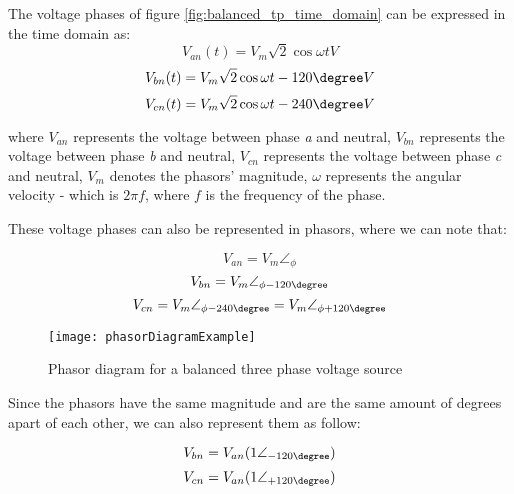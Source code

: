 The voltage phases of figure \ref{fig:balanced_tp_time_domain} can be expressed in the time domain as:
\begin{equation} \label{eq:balanced_tpVan_timedomain}
	V_{an}(t) = V_{m}\sqrt{2}\cos{\omega t} V
\end{equation}
\begin{equation} \label{eq:balanced_tpVan_timedomain}
	V_{bn}(t) = V_{m}\sqrt{2}\cos{\omega t - 120\degree} V
\end{equation}
\begin{equation} \label{eq:balanced_tpVan_timedomain}
	V_{cn}(t) = V_{m}\sqrt{2}\cos{\omega t - 240\degree} V
\end{equation}

where $V_{an}$ represents the voltage between phase \emph{a} and neutral, $V_{bn}$ represents the voltage between phase \emph{b} and neutral, $V_{cn}$ represents the voltage between phase \emph{c} and neutral, $V_{m}$ denotes the phasors' magnitude, $\omega$ represents the angular velocity - which is $2\pi f$, where $f$ is the frequency of the phase. 

These voltage phases can also be represented in phasors, where we can note that:

\begin{equation} \label{eq:balanced_tpVan}
	V_{an} = V_{m}\angle_{\phi}
\end{equation}
\begin{equation} \label{eq:balanced_tpVbn}
	V_{bn} = V_{m}\angle_{\phi - 120\degree} 
\end{equation}
\begin{equation} \label{eq:balanced_tpVcn}
	V_{cn} = V_{m}\angle_{\phi - 240\degree} = V_{m}\angle_{\phi + 120\degree} 
\end{equation}

\begin{figure}[htbp]
	\centering
	\texttt{[image: phasorDiagramExample]}
	\caption{Phasor diagram for a balanced three phase voltage source}
	\label{fig:balanced_tp_phasor_domain}
\end{figure}

Since the phasors have the same magnitude and are the same amount of degrees apart of each other, we can also represent them as follow:

\begin{equation} \label{eq:balanced_Vbn2}
	V_{bn} = V_{an}(1\angle_{-120\degree})
\end{equation}
\begin{equation} \label{eq:balanced_Vcn2}
	V_{cn} = V_{an}(1\angle_{+120\degree})
\end{equation}


